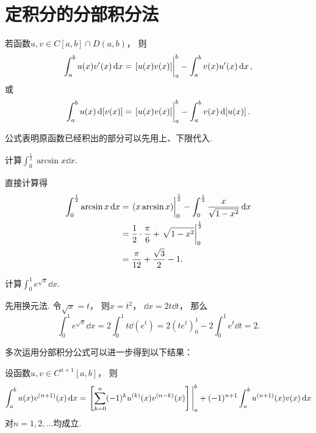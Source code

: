 \section{定积分的分部积分法}
\begin{theorem}\label{theorem:定积分.定积分的分部积分法}
若函数\(u,v \in C[a,b] \cap D(a,b)\)，
则\begin{equation}
	\int_a^b u(x) v'(x) \dd{x}
	= \eval{[u(x) v(x)]}_a^b
	- \int_a^b v(x) u'(x) \dd{x},
\end{equation}
或\begin{equation}
	\int_a^b u(x) \dd{[v(x)]}
	= \eval{[u(x) v(x)]}_a^b
	- \int_a^b v(x) \dd{[u(x)]}.
\end{equation}
\end{theorem}
公式表明原函数已经积出的部分可以先用上、下限代入.

\begin{example}
计算\(\int_0^{\frac12} \arcsin x \dd{x}\).
\begin{solution}
直接计算得\begin{align*}
	\int_0^{\frac12} \arcsin x \dd{x}
	&= \eval{(x \arcsin x)}_0^{\frac12}
		- \int_0^{\frac12} \frac{x}{\sqrt{1-x^2}} \dd{x} \\
	&= \frac12 \cdot \frac\pi6 + \eval{\sqrt{1-x^2}}_0^{\frac12} \\
	&= \frac\pi{12} + \frac{\sqrt3}2 - 1.
\end{align*}
\end{solution}
\end{example}

\begin{example}
计算\(\int_0^1 e^{\sqrt{x}} \dd{x}\).
\begin{solution}
先用换元法.
令\(\sqrt{x}=t\)，
则\(x=t^2\)，
\(\dd{x} = 2t\dd{t}\)，
那么\[
	\int_0^1 e^{\sqrt{x}} \dd{x}
	= 2 \int_0^1 t \dd(e^t)
	= 2 (t e^t)_0^1 - 2 \int_0^1 e^t \dd{t}
	= 2.
\]
\end{solution}
\end{example}

多次运用分部积分公式可以进一步得到以下结果：
\begin{corollary}
设函数\(u,v \in C^{n+1}[a,b]\)，
则\[
	\int_a^b u(x) v^{(n+1)}(x) \dd{x}
	= \eval{\left[
		\sum_{k=0}^n (-1)^k u^{(k)}(x) v^{(n-k)}(x)
	\right]}_a^b
	+ (-1)^{n+1} \int_a^b u^{(n+1)}(x) v(x) \dd{x}
\]对\(n=1,2,\dotsc\)均成立.
\end{corollary}

